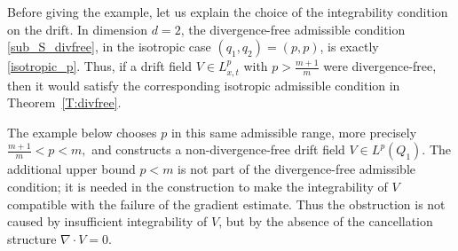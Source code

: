 \documentclass{amsart}
\numberwithin{equation}{section}
\begin{document}
Before giving the example, let us explain the choice of the integrability
condition on the drift. In dimension \(d=2\), the divergence-free admissible
condition \eqref{sub_S_divfree}, in the isotropic case \((q_1,q_2)=(p,p)\),
is exactly \eqref{isotropic_p}. Thus, if a drift field
\(V\in L^p_{x,t}\) with \(p>\frac{m+1}{m}\) were divergence-free, then it
would satisfy the corresponding isotropic admissible condition in
Theorem~\ref{T:divfree}.




The example below chooses \(p\) in this same admissible range, more precisely
\(
\frac{m+1}{m}<p<m,
\)
and constructs a non-divergence-free drift field
\(
V\in L^p(Q_1).
\)
The additional upper bound \(p<m\) is not part of the divergence-free
admissible condition; it is needed in the construction to make the
integrability of \(V\) compatible with the failure of the gradient estimate.
Thus the obstruction is not caused by insufficient integrability of \(V\),
but by the absence of the cancellation structure \(\nabla\cdot V=0\).
\end{document}
